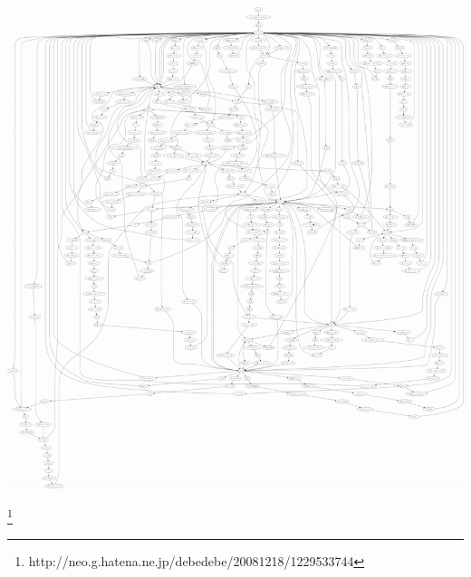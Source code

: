 \documentclass[cjk,dvipdfmx,20pt]{beamer}
\begin{document}
\begin{frame}{}

\begin{center}
\includegraphics[width=1.0\hsize]{image200812/watashi-graph.png}
\end{center}
\footnote{http://neo.g.hatena.ne.jp/debedebe/20081218/1229533744}
\end{frame}

\begin{frame}{}
\end{frame}
\end{document}
